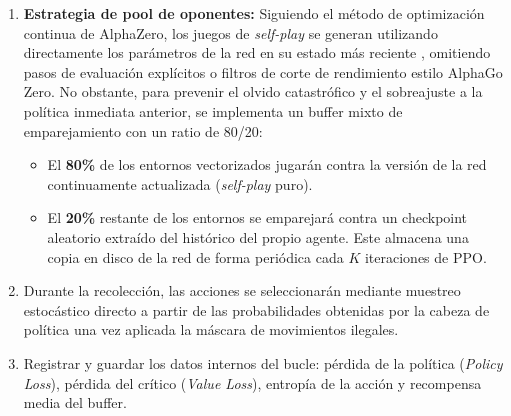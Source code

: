 \documentclass[12pt, a4paper]{article}
\let\cite\supercite
\begin{document}
\begin{enumerate}
\begin{itemize}
\begin{enumerate}
                \item \textbf{Estrategia de pool de oponentes:} Siguiendo el método de optimización continua de AlphaZero, los juegos de \textit{self-play} se generan utilizando directamente los parámetros de la red en su estado más reciente \cite{silver2018general}, omitiendo pasos de evaluación explícitos o filtros de corte de rendimiento estilo AlphaGo Zero. No obstante, para prevenir el olvido catastrófico y el sobreajuste a la política inmediata anterior, se implementa un buffer mixto de emparejamiento con un ratio de 80/20:
                    \begin{itemize}
                        \item El \textbf{80\%} de los entornos vectorizados jugarán contra la versión de la red continuamente actualizada (\textit{self-play} puro).
                        \item El \textbf{20\%} restante de los entornos se emparejará contra un checkpoint aleatorio extraído del histórico del propio agente. Este almacena una copia en disco de la red de forma periódica cada $K$ iteraciones de PPO.
                    \end{itemize}
                \item Durante la recolección, las acciones se seleccionarán mediante muestreo estocástico directo a partir de las probabilidades obtenidas por la cabeza de política una vez aplicada la máscara de movimientos ilegales.
                \item Registrar y guardar los datos internos del bucle: pérdida de la política (\textit{Policy Loss}), pérdida del crítico (\textit{Value Loss}), entropía de la acción y recompensa media del buffer.
            \end{enumerate}
    \end{itemize}


\end{enumerate}
\end{document}

